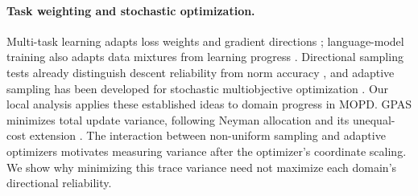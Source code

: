 \paragraph{Task weighting and stochastic optimization.}
Multi-task learning adapts loss weights and gradient directions
\citep{chen2018gradnorm,sener2019multitasklearningmultiobjectiveoptimization,
yu2020gradientsurgerymultitasklearning}; language-model training also adapts
data mixtures from learning progress \citep{albalak2023efficient,wang2025dump}.
Directional sampling tests already distinguish descent reliability from
norm accuracy \citep{bollapragada2018adaptive}, and adaptive sampling has
been developed for stochastic multiobjective optimization
\citep{zhao2024adaptive}. Our local analysis applies these established
ideas to domain progress in MOPD. GPAS minimizes total update variance,
following Neyman allocation and its unequal-cost extension
\citep{neyman1934representative,cochran1977sampling}.
The interaction between non-uniform sampling and adaptive optimizers
\citep{lahire2023nonuniformadaptive} motivates measuring variance after
the optimizer's coordinate scaling. We show why minimizing this
trace variance need not maximize each domain's directional reliability.
